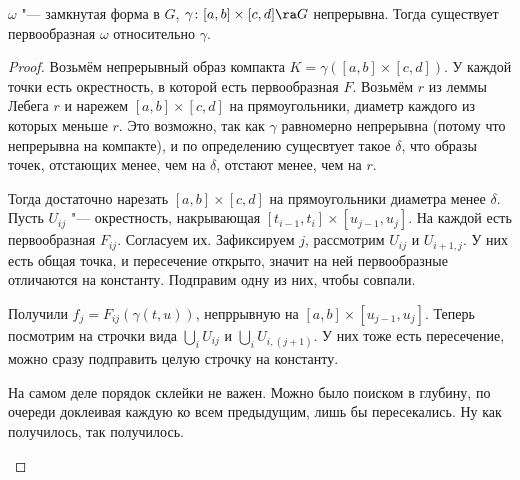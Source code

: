 \begin{theorem}
	$\omega$ "--- замкнутая форма в $G$, $\gamma\colon [a, b] \times [c, d] \ra G$ непрерывна.
	Тогда существует первообразная $\omega$ относительно $\gamma$.
\end{theorem}
\begin{proof}
	Возьмём непрерывный образ компакта $K = \gamma([a, b] \times [c, d])$.
	У каждой точки есть окрестность, в которой есть первообразная $F$.
	Возьмём $r$ из леммы Лебега $r$ и нарежем $[a, b] \times [c, d]$ на прямоугольники, диаметр каждого из которых меньше $r$.
	Это возможно, так как $\gamma$ равномерно непрерывна (потому что непрерывна на компакте), и по определению сущесвтует такое $\delta$,
	что образы точек, отстающих менее, чем на $\delta$, отстают менее, чем на $r$.

	Тогда достаточно нарезать $[a, b] \times [c, d]$ на прямоугольники диаметра менее $\delta$.
	Пусть $U_{ij}$ "--- окрестность, накрывающая $[t_{i-1}, t_i] \times [u_{j-1}, u_j]$.
	На каждой есть первообразная $F_{ij}$. Согласуем их.
	Зафиксируем $j$, рассмотрим $U_{ij}$ и $U_{i+1,j}$.
	У них есть общая точка, и пересечение открыто, значит на ней первообразные отличаются на константу.
	Подправим одну из них, чтобы совпали.

	Получили $f_j = F_{ij}(\gamma(t, u))$, непррывную на $[a, b] \times [u_{j-1}, u_j]$.
	Теперь посмотрим на строчки вида $\bigcup\limits_i U_{ij}$ и $\bigcup\limits_i U_{i,(j+1)}$.
	У них тоже есть пересечение, можно сразу подправить целую строчку на константу.

	\begin{Rem}
		На самом деле порядок склейки не важен.
		Можно было поиском в глубину, по очереди доклеивая каждую ко всем предыдущим, лишь бы пересекались.
		Ну как получилось, так получилось.
	\end{Rem}
\end{proof}

